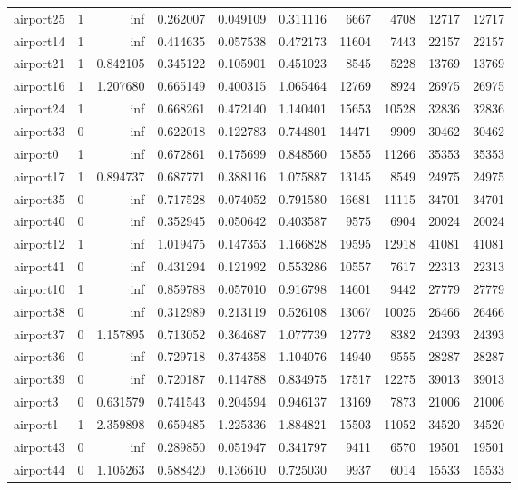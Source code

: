 \begin{longtable}{|l|r|r|r|r|r|r|r|r|r|}
airport25 & 1 & inf & 0.262007 & 0.049109 & 0.311116 & 6667 & 4708 & 12717 & 12717 \\
airport14 & 1 & inf & 0.414635 & 0.057538 & 0.472173 & 11604 & 7443 & 22157 & 22157 \\
airport21 & 1 & 0.842105 & 0.345122 & 0.105901 & 0.451023 & 8545 & 5228 & 13769 & 13769 \\
airport16 & 1 & 1.207680 & 0.665149 & 0.400315 & 1.065464 & 12769 & 8924 & 26975 & 26975 \\
airport24 & 1 & inf & 0.668261 & 0.472140 & 1.140401 & 15653 & 10528 & 32836 & 32836 \\
airport33 & 0 & inf & 0.622018 & 0.122783 & 0.744801 & 14471 & 9909 & 30462 & 30462 \\
airport0 & 1 & inf & 0.672861 & 0.175699 & 0.848560 & 15855 & 11266 & 35353 & 35353 \\
airport17 & 1 & 0.894737 & 0.687771 & 0.388116 & 1.075887 & 13145 & 8549 & 24975 & 24975 \\
airport35 & 0 & inf & 0.717528 & 0.074052 & 0.791580 & 16681 & 11115 & 34701 & 34701 \\
airport40 & 0 & inf & 0.352945 & 0.050642 & 0.403587 & 9575 & 6904 & 20024 & 20024 \\
airport12 & 1 & inf & 1.019475 & 0.147353 & 1.166828 & 19595 & 12918 & 41081 & 41081 \\
airport41 & 0 & inf & 0.431294 & 0.121992 & 0.553286 & 10557 & 7617 & 22313 & 22313 \\
airport10 & 1 & inf & 0.859788 & 0.057010 & 0.916798 & 14601 & 9442 & 27779 & 27779 \\
airport38 & 0 & inf & 0.312989 & 0.213119 & 0.526108 & 13067 & 10025 & 26466 & 26466 \\
airport37 & 0 & 1.157895 & 0.713052 & 0.364687 & 1.077739 & 12772 & 8382 & 24393 & 24393 \\
airport36 & 0 & inf & 0.729718 & 0.374358 & 1.104076 & 14940 & 9555 & 28287 & 28287 \\
airport39 & 0 & inf & 0.720187 & 0.114788 & 0.834975 & 17517 & 12275 & 39013 & 39013 \\
airport3 & 0 & 0.631579 & 0.741543 & 0.204594 & 0.946137 & 13169 & 7873 & 21006 & 21006 \\
airport1 & 1 & 2.359898 & 0.659485 & 1.225336 & 1.884821 & 15503 & 11052 & 34520 & 34520 \\
airport43 & 0 & inf & 0.289850 & 0.051947 & 0.341797 & 9411 & 6570 & 19501 & 19501 \\
airport44 & 0 & 1.105263 & 0.588420 & 0.136610 & 0.725030 & 9937 & 6014 & 15533 & 15533 \\

\end{longtable}
